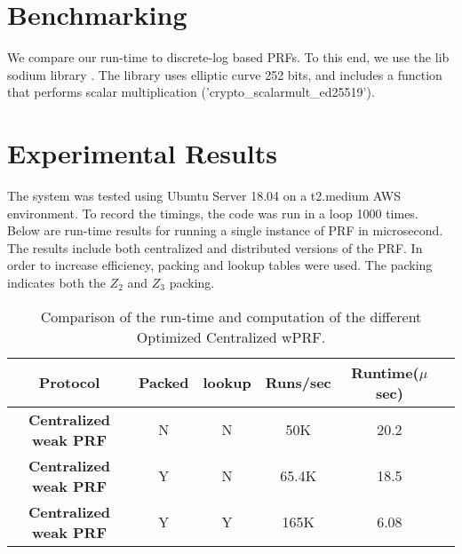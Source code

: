 \section{Benchmarking}

We compare our run-time to discrete-log based PRFs. To this end, we use the lib sodium library \cite{LibSodium}. The library uses elliptic curve 252 bits, and includes a function that performs scalar multiplication ('crypto\_scalarmult\_ed25519').


\section{Experimental Results}

The system was tested using Ubuntu Server 18.04 on a t2.medium AWS environment. To record the timings, the code was run in a loop 1000 times. Below are run-time results for running a single instance of PRF in microsecond. The results include both centralized and distributed versions of the PRF. In order to increase efficiency, packing and lookup tables were used. The packing indicates both the $Z_2$ and $Z_3$ packing.

\begin{table}[htbp]
	\begin{center}
		\begin{tabular}{|c|c|c|c|c|c|}
			\hline
			\textbf{Protocol} & \textbf{Packed }  &  \textbf{lookup} & \textbf{Runs/sec} & \textbf{Runtime($\mu$ sec)}\\
			\hline
			\hline
			\textbf{Centralized weak PRF}  & N  & N  &  50K&20.2 \\
			\hline
			\textbf{Centralized weak PRF} & Y  &  N & 65.4K &18.5  \\
			\hline
			\textbf{Centralized weak PRF} & Y  &  Y & 165K &6.08 \\
			\hline
		\end{tabular}
		
		\vspace{-1mm}
		\caption{Comparison of the run-time and computation of the different Optimized Centralized wPRF.}
		\label{CentralRuntimeTable}
	\end{center}
	\vspace{-5mm}
\end{table}

